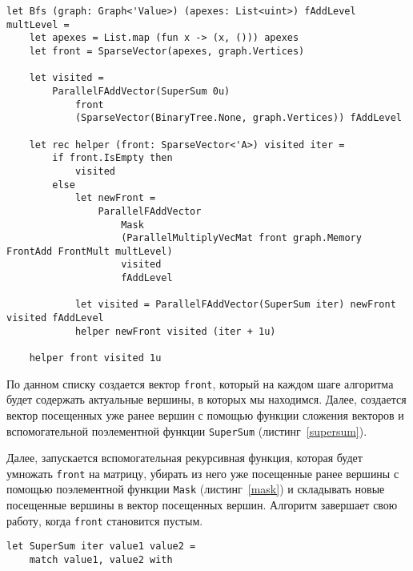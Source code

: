 \begin{lstlisting}[style=codelistingstyle, caption={Алгоритм Bfs с использованием векторно-матричных операций},label={bfs}, frame=single]
let Bfs (graph: Graph<'Value>) (apexes: List<uint>) fAddLevel multLevel =
    let apexes = List.map (fun x -> (x, ())) apexes
    let front = SparseVector(apexes, graph.Vertices)

    let visited =
        ParallelFAddVector(SuperSum 0u) 
            front 
            (SparseVector(BinaryTree.None, graph.Vertices)) fAddLevel

    let rec helper (front: SparseVector<'A>) visited iter =
        if front.IsEmpty then
            visited
        else
            let newFront =
                ParallelFAddVector
                    Mask
                    (ParallelMultiplyVecMat front graph.Memory FrontAdd FrontMult multLevel)
                    visited
                    fAddLevel

            let visited = ParallelFAddVector(SuperSum iter) newFront visited fAddLevel
            helper newFront visited (iter + 1u)

    helper front visited 1u
\end{lstlisting}

По данном списку создается вектор \texttt{front}, который на каждом шаге алгоритма будет содержать актуальные вершины, в которых мы находимся. Далее, создается вектор посещенных уже ранее вершин с помощью функции сложения векторов и вспомогательной поэлементной функции \texttt{SuperSum} (листинг~\ref{supersum}). 

Далее, запускается вспомогательная рекурсивная функция, которая будет умножать \texttt{front} на матрицу, убирать из него уже посещенные ранее вершины с помощью поэлементной функции \texttt{Mask} (листинг~\ref{mask}) и складывать новые посещенные вершины в вектор посещенных вершин. Алгоритм завершает свою работу, когда \texttt{front} становится пустым. 

\begin{lstlisting}[style=codelistingstyle, caption={Вспомогательная поэлементная функция для определения посещенных вершин},label={supersum}, frame=single]
let SuperSum iter value1 value2 =
    match value1, value2 with
    | Option.None, Option.None -> Option.None
    | Option.None, value2 -> value2
    | Some _, Option.None -> Some iter
\end{lstlisting} 

\begin{lstlisting}[style=codelistingstyle, caption={Вспомогательная поэлементная функция для удаления из ветора front посещенных ранее вершин},label={mask}, frame=single]
let Mask value1 value2 =
    match value1, value2 with
    | Option.None, _ -> Option.None
    | Some value1, Option.None -> Some value1
    | Some _, _ -> Option.None
\end{lstlisting}